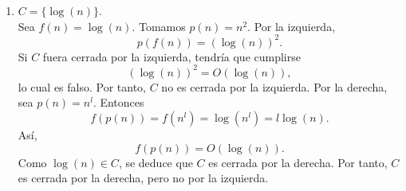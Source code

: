 \begin{ejercicio}
\begin{enumerate}
        \item[(f)] $C=\{\log(n)\}$. \\

            Sea $f(n)=\log(n)$. Tomamos $p(n)=n^2$. Por la izquierda,
            $$
            p(f(n))=(\log(n))^2.
            $$
            Si $C$ fuera cerrada por la izquierda, tendría que cumplirse
            $$
            (\log(n))^2=O(\log(n)),
            $$
            lo cual es falso. Por tanto, $C$ no es cerrada por la izquierda.
            Por la derecha, sea $p(n)=n^l$. Entonces
            $$
            f(p(n))=f(n^l)=\log(n^l)=l\log(n).
            $$
            Así,
            $$
            f(p(n))=O(\log(n)).
            $$
            Como $\log(n)\in C$, se deduce que $C$ es cerrada por la derecha.
            Por tanto, $C$ es cerrada por la derecha, pero no por la izquierda.
    \end{enumerate}
\end{ejercicio}



